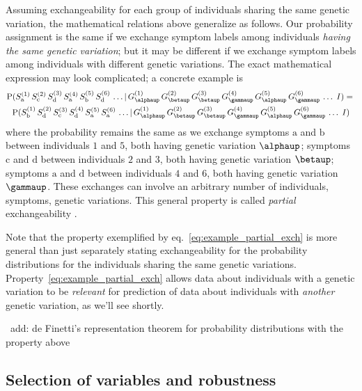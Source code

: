 \documentclass[\ifafour a4paper,12pt,\else a5paper,10pt,\fi%
onecolumn,oneside,article,%
british%
]{memoir}
\theoremstyle{remark}
\theoremstyle{innote}
\renewcommand*{\cites}{\parencites}
\newcommand*{\p}{\mathrm{P}}%
\renewcommand*{\|}{\mathpunct{|}}
\newcommand*{\eqn}{eq.}%
\newcommand*{\puzzle}{\maltese}
\newcommand{\mynote}[1]{ {\color{notecolour}\puzzle\ #1}}
\newcommand*{\yI}{I}
\newcommand*{\yGi}[1]{G^{(#1)}}
\newcommand*{\ySi}[1]{S^{(#1)}}
\begin{document}
Assuming exchangeability for each group of individuals sharing the same
genetic variation, the mathematical relations above generalize as follows.
Our probability assignment is the same if we exchange symptom labels
among individuals \emph{having the same genetic variation}; but it may be
different if we exchange symptom labels among individuals with different
genetic variations. The exact mathematical expression may look complicated;
a concrete example is
\begin{multline}
  \label{eq:example_partial_exch}
  \p(\ySi{1}_{\text{a}}\, \ySi{2}_{\text{c}}\, \ySi{3}_{\text{d}}\,
  \ySi{4}_{\text{a}}\, \ySi{5}_{\text{b}}\, \ySi{6}_{\text{d}}\,\dotso \|
  \yGi{1}_{\alphaup}\, \yGi{2}_{\betaup}\, \yGi{3}_{\betaup}\,
  \yGi{4}_{\gammaup}\, \yGi{5}_{\alphaup}\, \yGi{6}_{\gammaup}\,\dotso
  \;\yI)
  ={}\\
  \p(\ySi{1}_{\text{b}}\, \ySi{2}_{\text{d}}\, \ySi{3}_{\text{c}}\,
  \ySi{4}_{\text{d}}\, \ySi{5}_{\text{a}}\, \ySi{6}_{\text{a}}\,\dotso \|
  \yGi{1}_{\alphaup}\, \yGi{2}_{\betaup}\, \yGi{3}_{\betaup}\,
  \yGi{4}_{\gammaup}\, \yGi{5}_{\alphaup}\, \yGi{6}_{\gammaup}\,\dotso
  \;\yI)
\end{multline}
where the probability remains the same as we exchange symptoms $\text{a}$
and $\text{b}$ between individuals $1$ and $5$, both having genetic
variation $\alphaup$; symptoms $\text{c}$ and $\text{d}$ between
individuals $2$ and $3$, both having genetic variation $\betaup$; symptoms
$\text{a}$ and $\text{d}$ between individuals $4$ and $6$, both having
genetic variation $\gammaup$. These exchanges can involve an arbitrary
number of individuals, symptoms, genetic variations. This general property
is called \emph{partial} exchangeability
\cites{definetti1938,diaconisetal1980b,diaconis1988}[for a connection with
sampling theory see][]{sugden1982,sugden1993}.

Note that the property exemplified by \eqn~\eqref{eq:example_partial_exch}
is more general than just separately stating exchangeability for the
probability distributions for the individuals sharing the same genetic
variations. Property~\eqref{eq:example_partial_exch} allows data about
individuals with a genetic variation to be \emph{relevant} for prediction
of data about individuals with \emph{another} genetic variation, as we'll
see shortly.


\mynote{add: de Finetti's representation theorem for probability
  distributions with the property above}

\subsection{Selection of variables and robustness}
\label{sec:variable_selection_robustness}
\end{document}
